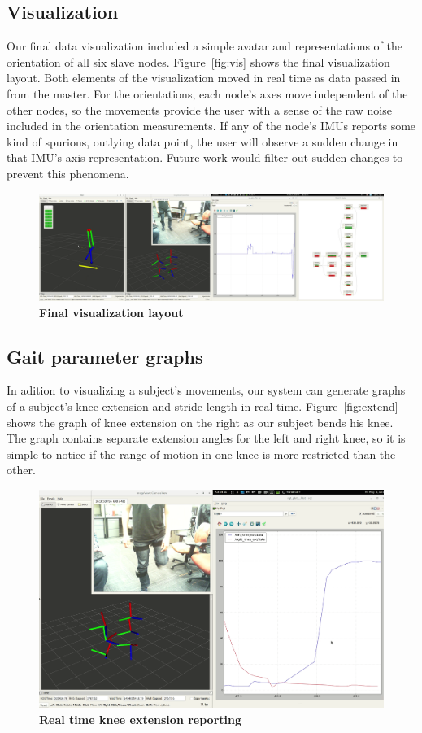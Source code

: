 \documentclass[conference]{IEEEtran}
\begin{document}
\subsection{Visualization}
Our final data visualization included a simple avatar and representations of the
orientation of all six slave nodes. Figure~\ref{fig:vis} shows the final visualization layout.
Both elements of the visualization moved in real time as data passed in from the master.
For the orientations, each node's axes move independent of the other nodes, so the
movements provide the user with a sense of the raw noise included in the orientation
measurements. If any of the node's IMUs reports some kind of spurious, outlying data
point, the user will observe a sudden change in that IMU's axis representation. Future
work would filter out sudden changes to prevent this phenomena. 

\begin{figure}[h]
  \centering
  \includegraphics[width=0.95\columnwidth]{figs/vis}
  \caption{{\bf Final visualization layout}}
  \label{fig:vis }
\end{figure}

\subsection{Gait parameter graphs}
In adition to visualizing a subject's movements, our system can generate graphs of a
subject's knee extension and stride length in real time. Figure~\ref{fig:extend} shows the
graph of knee extension on the right as our subject bends his knee. The graph contains
separate extension angles for the left and right knee, so it is simple to notice if the
range of motion in one knee is more restricted than the other. 

\begin{figure}[h]
  \centering
  \includegraphics[width=0.95\columnwidth]{figs/extend}
  \caption{{\bf Real time knee extension reporting}}
  \label{fig:extend }
\end{figure}
\end{document}
